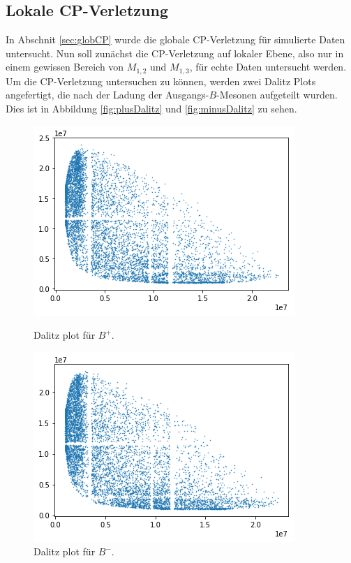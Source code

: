 \subsection{Lokale CP-Verletzung}

In Abschnit \ref{sec:globCP} wurde die globale CP-Verletzung für simulierte Daten untersucht.
Nun soll zunächst die CP-Verletzung auf lokaler Ebene, also nur in einem gewissen Bereich von $M_{1,2}$ und $M_{1,3}$, für echte Daten untersucht werden.
Um die CP-Verletzung untersuchen zu können, werden zwei Dalitz Plots angefertigt, die nach der Ladung der Ausgangs-$B$-Mesonen aufgeteilt wurden.
Dies ist in Abbildung \ref{fig:plusDalitz} und \ref{fig:minusDalitz} zu sehen.

\begin{figure}
  \centering
    \includegraphics[width=\linewidth]{plots/real_data_dalitz_positive_B.png}
    \caption{Dalitz plot für $B^+$.
    \label{fig:plusDalitz}}
  \endminipage\hfill
    \includegraphics[width=\linewidth]{plots/real_data_negative_B.png}
    \caption{Dalitz plot für $B^-$.
    \label{fig:minusDalitz}}
  \endminipage
  \label{fig:split_resonances}
\end{figure}

